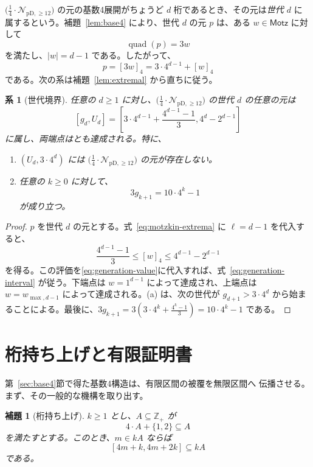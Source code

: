 \documentclass[12pt]{ltjsarticle}
\theoremstyle{plain}
\newtheorem{lemma}[theorem]{補題}
\newtheorem{corollary}[theorem]{系}
\theoremstyle{definition}
\theoremstyle{plain}
\newcommand{\Pset}{%
  \bigl(\tfrac{1}{4}\cdot\mathcal{N}_{\mathrm{pD},\geq 12}\bigr)%
}
\begin{document}
$\Pset$ の元の基数4展開がちょうど $d$ 桁であるとき、その元は\emph{世代 $d$} に
属するという。補題~\ref{lem:base4} により、世代 $d$ の元 $p$ は、ある
$w\in\mathsf{Motz}$ に対して
\[
 \operatorname{quad}(p)=3w
\]
を満たし、$|w|=d-1$ である。したがって、
\begin{equation}\label{eq:generation-value}
 p=[3w]_4=3\cdot4^{d-1}+[w]_4
\end{equation}
である。次の系は補題~\ref{lem:extremal} から直ちに従う。

\begin{corollary}[世代境界]\label{cor:gen}
任意の $d\geq1$ に対し、$\Pset$ の世代 $d$ の任意の元は
\begin{equation}\label{eq:generation-interval}
  [g_d,U_d]
  =\left[
  3\cdot4^{d-1}+\frac{4^{d-1}-1}{3},
  4^d-2^{d-1}
  \right]
\end{equation}
に属し、両端点はとも達成される。特に、
\begin{enumerate}[label=\textup{(\alph*)}]
\item $(U_d,3\cdot4^d)$ には $\Pset$ の元が存在しない。
\item 任意の $k\geq0$ に対して、
\begin{equation}\label{eq:three-g}
  3g_{k+1}=10\cdot4^k-1
\end{equation}
が成り立つ。
\end{enumerate}
\end{corollary}

\begin{proof}
$p$ を世代 $d$ の元とする。式~\eqref{eq:motzkin-extrema} に $\ell=d-1$ を代入すると、
\[
 \frac{4^{d-1}-1}{3}
 \leq[w]_4
 \leq4^{d-1}-2^{d-1}
\]
を得る。この評価を\eqref{eq:generation-value}に代入すれば、式~\eqref{eq:generation-interval}
が従う。下端点は $w=1^{d-1}$ によって達成され、上端点は
$w=w_{\max,d-1}$ によって達成される。(a) は、次の世代が
$g_{d+1}>3\cdot4^d$ から始まることによる。最後に、$  3g_{k+1}
  =3\left(3\cdot4^k+\frac{4^k-1}{3}\right)
  =10\cdot4^k-1$
である。
\end{proof}

\section{桁持ち上げと有限証明書}\label{sec:lifting}

第~\ref{sec:base4}節で得た基数4構造は、有限区間の被覆を無限区間へ
伝播させる。まず、その一般的な機構を取り出す。

\begin{lemma}[桁持ち上げ]\label{lem:digit-lifting}
$k\geq1$ とし、$A\subseteq\mathbb{Z}_+$ が
\begin{equation}\label{eq:digit-closure}
 4\cdot A+\{1,2\}\subseteq A
\end{equation}
を満たすとする。このとき、$m\in kA$ ならば
\begin{equation}\label{eq:digit-lifting}
 [4m+k,4m+2k]\subseteq kA
\end{equation}
である。
\end{lemma}
\end{document}
